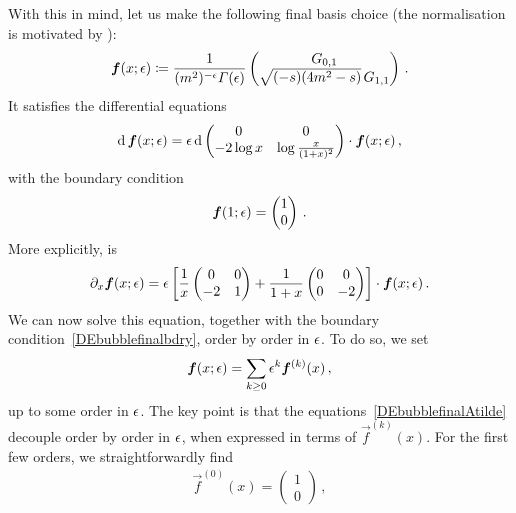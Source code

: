 With this in mind, let us make the following final basis choice (the normalisation is motivated by ):
\begin{align}\label{eq:UTbasisbubblefinal}
\vec{f}(x;\eps) \coloneqq \frac{1}{(m^2)^{-\eps} \Gamma(\eps)}  \begin{pmatrix}
G_{0,1}\\
\sqrt{(-s) (4m^2-s)} \, G_{1,1}
\end{pmatrix}\,.
\end{align}
It satisfies the differential equations
\begin{align}\label{DEbubblefinalAtilde} 
\d \, \vec{f}(x;\eps) = \eps \, \d
 \begin{pmatrix}
0 & 0 \\
-2 \log x  & \log \frac{x}{(1+x)^2}  
\end{pmatrix} \cdot
 \vec{f}(x;\eps)\,,
\end{align}
with the boundary condition
\begin{align}\label{DEbubblefinalbdry}
\vec{f}(1;\eps)  =  \begin{pmatrix}
1\\
0
\end{pmatrix}\,.
\end{align}
More explicitly,  is
\begin{align}\label{DEbubblefinalAtilde2} 
\partial_x \vec{f}(x;\eps) = \eps  \left[ \frac{1}{x} 
 \begin{pmatrix}
0 & 0 \\
-2   & 1   
\end{pmatrix} 
+
\frac{1}{1+x}
 \begin{pmatrix}
0 & 0 \\
0  & -2   
\end{pmatrix} 
\right] \cdot
 \vec{f}(x;\eps)\,.
\end{align}
We can now solve this equation, together with the boundary condition~\eqref{DEbubblefinalbdry}, order by order in $\epsilon$.
To do so, we set
\begin{align}
 \vec{f}(x;\eps) = \sum_{k \ge 0} \eps^k  \vec{f}^{(k)}(x) \,,
\end{align}
up to some order in $\epsilon$.
The key point is that the equations~\eqref{DEbubblefinalAtilde} decouple order by order in $\epsilon$,  when expressed in terms of $ \vec{f}^{(k)}(x)$.
For the first few orders, we straightforwardly find
\begin{align} 
\vec{f}^{(0)}(x) =  \begin{pmatrix}
1  \\
0     
\end{pmatrix} \,,
\end{align}
